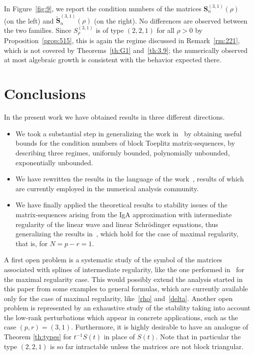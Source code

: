 \documentclass[addpoints,12pt,letter]{article}
\newcommand{\SR}{S}
\numberwithin{equation}{section}
\theoremstyle{definition}
\begin{document}
In Figure~\ref{fig:9}, we report the condition numbers of the matrices $\mathbf{S}_n^{(3,1)}(\rho)$ (on the left) and $\widetilde{\mathbf{S}}_n^{(3,1)}(\rho)$ (on the right). No differences are observed between the two families. Since $\SR_{\rho}^{(3,1)}$ is of type $(2,2,1)$ for all $\rho>0$ by Proposition~\ref{prop:515}, this is again the regime discussed in Remark~\ref{rm:221}, which is not covered by Theorems~\ref{th:G1} and~\ref{th:3.9}; the numerically observed at most algebraic growth is consistent with the behavior expected there.

\section{Conclusions}\label{sec:end}

In the present work we have obtained results in three different directions.
\begin{itemize}
\item We took a substantial step in generalizing the work in~\cite{AmoBru96,BoGr99} by obtaining useful bounds for the condition numbers of block Toeplitz matrix-sequences, by describing three regimes, uniformly bounded, polynomially unbounded, exponentially unbounded.
\item We have rewritten the results in the language of the work~\cite{AmoBru96}, results of which are currently employed in the numerical analysis community.
\item We have finally applied the theoretical results to stability issues of the matrix-sequences arising from the IgA approximation with intermediate regularity of the linear wave and linear Schr\"odinger equations, thus generalizing the results in~\cite{FeFr26,FeGo25}, which hold for the case of maximal regularity, that is, for $N=p-r=1$.
\end{itemize}

A first open problem is a systematic study of the symbol of the matrices associated with splines of intermediate regularity, like the one performed in~\cite{GaMa14,FeFr26} for the maximal regularity case. This would possibly extend the analysis started in this paper from some examples to general formulas, which are currently available only for the case of maximal regularity, like~\eqref{rho} and~\eqref{delta}. Another open problem is represented by an exhaustive study of the stability taking into account the low-rank perturbations which appear in concrete applications, such as the case $(p,r) = (3,1)$. Furthermore, it is highly desirable to have an analogue of Theorem \ref{th:types} for $t^{-1}S(t)$ in place of $S(t)$. Note that in particular the type $(2, 2, 1)$ is so far intractable unless the matrices are not block triangular.
\end{document}

